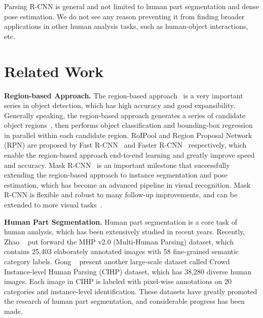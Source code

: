 \documentclass[10pt,twocolumn,letterpaper]{article}
\begin{document}
Parsing R-CNN is general and not limited to human part segmentation and dense pose estimation. We do not see any reason preventing it from finding broader applications in other human analysis tasks, such as human-object interactions, etc.


\section{Related Work}

\noindent\textbf{Region-based Approach.} The region-based approach~\cite{Girshick_cvpr2015_dpm, Girshick_cvpr2014_rcnn, He_eccv2014_sppnet, Girshick_iccv2015_fast-rcnn, Ren_nips2015_faster-rcnn, Lin_cvpr2017_fpn, He_iccv2017_maskrcnn} is a very important series in object detection, which has high accuracy and good expansibility. Generally speaking, the region-based approach generates a series of candidate object regions~\cite{Uijlings_ijcv2013_selective, Zitnick_eccv2014_edgebox, Ren_nips2015_faster-rcnn}, then performs object classification and bounding-box regression in parallel within each candidate region. RoIPool and Region Proposal Network (RPN) are proposed by Fast R-CNN~\cite{Girshick_iccv2015_fast-rcnn} and Faster R-CNN~\cite{Ren_nips2015_faster-rcnn} respectively, which enable the region-based approach end-to-end learning and greatly improve speed and accuracy. Mask R-CNN~\cite{He_iccv2017_maskrcnn} is an important milestone that successfully extending the region-based approach to instance segmentation and pose estimation, which has become an advanced pipeline in visual recognition. Mask R-CNN is flexible and robust to many follow-up improvements, and can be extended to more visual tasks~\cite{Cao_cvpr2017_openpose, Guler_cvpr2018_densepose, Gkioxari_cvpr2018_interacnet, Rohit_cvpr2018_dandt, Hu_cvpr2018_segment}.

\vspace{6pt}
\noindent\textbf{Human Part Segmentation.} Human part segmentation is a core task of human analysis, which has been extensively studied in recent years. Recently, Zhao \etal~\cite{Zhao_mm2018_mhpv2} put forward the MHP v2.0 (Multi-Human Parsing) dataset, which contains 25,403 elaborately annotated images with 58 fine-grained semantic category labels. Gong \etal~\cite{Gong_eccv2018_pgn} present another large-scale dataset called Crowd Instance-level Human Parsing (CIHP) dataset, which has 38,280 diverse human images. Each image in CIHP is labeled with pixel-wise annotations on 20 categories and instance-level identification. These datasets have greatly promoted the research of human part segmentation, and considerable progress has been made. 
\end{document}
